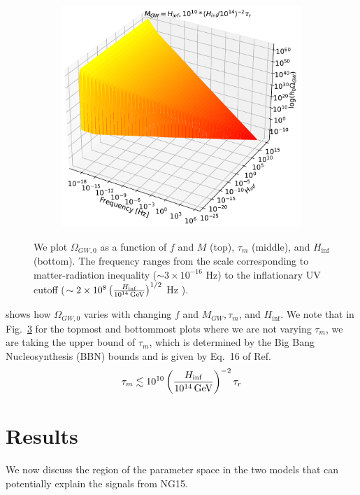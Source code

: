 \documentclass[prd,twocolumn,aps,psfig,nofootinbib,nobibnotes,superscriptaddress,preprintnumbers,times]{revtex4-2}
\newcommand{\GeV}{\,{\rm GeV}}
\begin{document}
\begin{figure}[H]
\begin{subfigure}{.5\textwidth}
  \label{fig:contour-b}
\end{subfigure}
\begin{subfigure}{.5\textwidth}
  \centering
  \includegraphics[width=.82\linewidth]{fig/fig4c.pdf}  
  \label{fig:contour-c}
\end{subfigure}
\caption{We plot $\Omega_{GW,0}$ as a function of $f$ and $M$ (top), $\tau_m$ (middle), and $H_{\inf}$ (bottom). The frequency ranges from the scale corresponding to matter-radiation inequality ($\sim 3\times10^{-16}$ Hz) to the inflationary UV cutoff ($\sim 2\times 10^8\left(\frac{H_{\inf}}{10^{14} \GeV}\right)^{1/2}$ Hz \cite{Fujita:2018}). } 
\label{fig:contours}
\end{figure}
\hspace{-1em}shows how $\Omega_{GW,0}$ varies with changing $f$ and $M_{GW}, \tau_m$, and $H_{\inf}$. We note that in Fig.\ \ref{fig:contours} for the topmost and bottommost plots where we are not varying $\tau_m$, we are taking the upper bound of $\tau_m$, which is determined by the Big Bang Nucleosynthesis (BBN) bounds and is given by Eq.\ 16 of Ref.\ \cite{Fujita:2018}
\begin{equation}\label{eqn:tau_m_bbn}
    \tau_m \lesssim 10^{10}\left(\frac{H_{\inf}}{10^{14} \GeV}\right)^{-2}\tau_r
\end{equation}

\section{Results}\label{sec:results}
We now discuss the region of the parameter space in the two models that can potentially explain the signals from NG15. 
\end{document}
